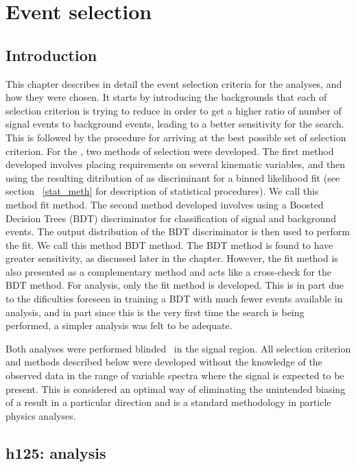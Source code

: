 \chapter{Event selection}
\label{evt_sel}
\section{Introduction}
\label{evt_sel_intro}
This chapter describes in detail the event selection criteria for the analyses, and how they were chosen. It starts by introducing the backgrounds that each of selection criterion is trying to reduce in order to get a higher ratio of number of signal events to background events, leading to a better sensitivity for the search. This is followed by the procedure for arriving at the best possible set of selection criterion. For the \hmue, two methods of selection were developed. The first method developed involves placing requirements on several kinematic variables, and then using the resulting ditribution of \mcol as discriminant for a binned likelihood fit (see section ~\ref{stat_meth} for description of statistical procedures). We call this method \mcol fit method. The second method developed involves using a Boosted Decision Trees (BDT) discriminator  for classification of signal and background events. The output distribution of the BDT discriminator is then used to perform the fit. We call this method BDT method. The BDT method is found to have greater sensitivity, as discussed later in the chapter. However, the \mcol fit method is also presented as a complementary method and acts like a cross-check for the BDT method. For \Hmue analysis, only the \mcol fit method is developed. This is in part due to the dificulties foreseen in training a BDT with much fewer events available in \Hmue analysis, and in part since this is the very first time the \Hmue search is being performed, a simpler analysis was felt to be adequate.  

Both analyses were performed blinded~\cite{blind_analysis} in the signal region. All selection criterion and methods described below were developed without the knowledge of the observed data in the range of variable spectra where the signal is expected to be present. This is considered an optimal way of eliminating the unintended biasing of a result in a particular direction and is a standard methodology in particle physics analyses.

\section{h125: \hmue analysis}
\label{h125_evt_sel}
